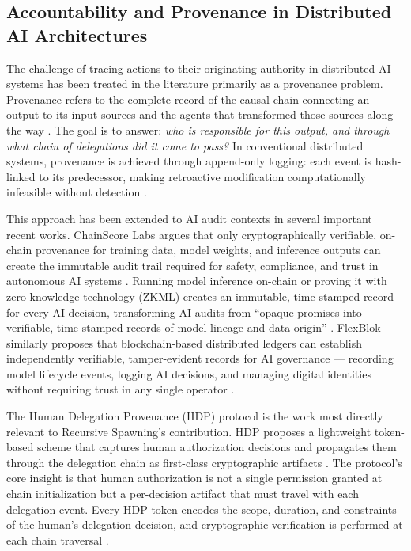 \subsection{Accountability and Provenance in Distributed AI Architectures}\label{sec:provenance}

The challenge of tracing actions to their originating authority in distributed AI systems has been treated in the literature primarily as a provenance problem.  Provenance refers to the complete record of the causal chain connecting an output to its input sources and the agents that transformed those sources along the way \cite{on_chain_provenance_ai}.  The goal is to answer: \emph{who is responsible for this output, and through what chain of delegations did it come to pass?}  In conventional distributed systems, provenance is achieved through append-only logging: each event is hash-linked to its predecessor, making retroactive modification computationally infeasible without detection \cite{blockchain_ai_governance}.

This approach has been extended to AI audit contexts in several important recent works.  ChainScore Labs argues that only cryptographically verifiable, on-chain provenance for training data, model weights, and inference outputs can create the immutable audit trail required for safety, compliance, and trust in autonomous AI systems \cite{on_chain_provenance_ai}.  Running model inference on-chain or proving it with zero-knowledge technology (ZKML) creates an immutable, time-stamped record for every AI decision, transforming AI audits from ``opaque promises into verifiable, time-stamped records of model lineage and data origin'' \cite{on_chain_provenance_ai}.  FlexBlok similarly proposes that blockchain-based distributed ledgers can establish independently verifiable, tamper-evident records for AI governance --- recording model lifecycle events, logging AI decisions, and managing digital identities without requiring trust in any single operator \cite{blockchain_ai_governance}.

The Human Delegation Provenance (HDP) protocol is the work most directly relevant to Recursive Spawning's contribution.  HDP proposes a lightweight token-based scheme that captures human authorization decisions and propagates them through the delegation chain as first-class cryptographic artifacts \cite{hdp2025arxiv}.  The protocol's core insight is that human authorization is not a single permission granted at chain initialization but a per-decision artifact that must travel with each delegation event.  Every HDP token encodes the scope, duration, and constraints of the human's delegation decision, and cryptographic verification is performed at each chain traversal \cite{hdp2025ietf}.

